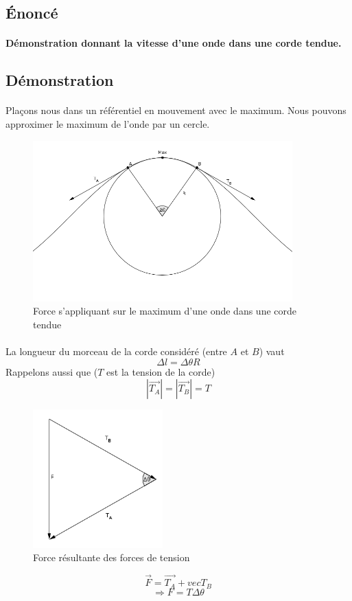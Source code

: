\documentclass[a4paper]{article}
\begin{document}
\subsection{Énoncé}
\paragraph{}\textbf{Démonstration donnant la vitesse d'une onde dans une corde tendue.}
\subsection{Démonstration}
\paragraph{}Plaçons nous dans un référentiel en mouvement avec le maximum. Nous pouvons approximer le maximum de l'onde par un cercle. 
\begin{figure}
\begin{center}
\includegraphics[width=10cm]{imgs/tension.png}
\end{center}
\caption{Force s'appliquant sur le maximum d'une onde dans une corde tendue}
\label{Force s'appliquant sur le maximum d'une onde dans une corde tendue}
\end{figure}
\paragraph{}La longueur du morceau de la corde considéré (entre $A$ et $B$) vaut
\[\Delta l=\Delta \theta R\]
Rappelons aussi que ($T$ est la tension de la corde)
\[\left|\vec{T_A}\right|=\left|\vec{T_B}\right|=T\]
\begin{figure}
\begin{center}
\includegraphics[width=5cm]{imgs/result.png}
\end{center}
\caption{Force résultante des forces de tension}
\label{Force résultante des forces de tension}
\end{figure}
\[\vec{F}=\vec{T_A}+vec{T_B}\]
\[\Rightarrow F=T\Delta\theta\]
\end{document}
